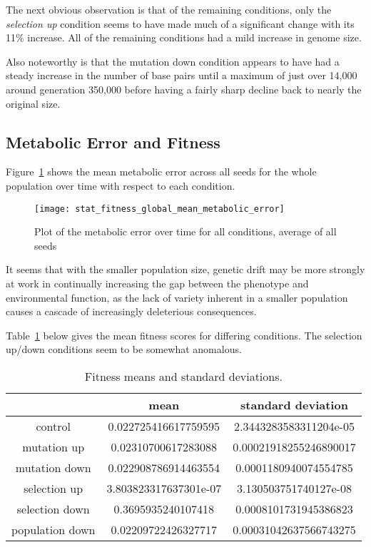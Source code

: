 The next obvious observation is that of the remaining conditions, only the \textit{selection up} condition seems to have made much of a significant change with its 11\% increase. All of the remaining conditions had a mild increase in genome size. 

Also noteworthy is that the mutation down condition appears to have had a steady increase in the number of base pairs until a maximum of just over 14,000 around generation 350,000 before having a fairly sharp decline back to nearly the original size. 

\subsection{Metabolic Error and Fitness}
Figure~\ref{fig:mean_metabolic_error} shows the mean metabolic error across all seeds for the whole population over time with respect to each condition. 
\begin{figure}[H]
	\texttt{[image: stat\_fitness\_global\_mean\_metabolic\_error]}
	\caption[Metabolic error]{Plot of the metabolic error over time for all conditions, average of all seeds}
	\label{fig:mean_metabolic_error}
\end{figure}
It seems that with the smaller population size, genetic drift may be more strongly at work in continually increasing the gap between the phenotype and environmental function, as the lack of variety inherent in a smaller population causes a cascade of increasingly deleterious consequences. 

Table~\ref{table:fitness_means_std_dev} below gives the mean fitness scores for differing conditions. The selection up/down conditions seem to be somewhat anomalous.
\begin{table}[H]
	\centering
	\begin{tabular}{|c||c|c|}
		\hline
		& \textbf{mean} & \textbf{standard deviation} \\
		\hline \hline
		control & 0.022725416617759595 & 2.3443283583311204e-05 \\
		\hline
		mutation up & 0.02310700617283088 & 0.00021918255246890017 \\
		\hline
		mutation down & 0.022908786914463554 & 0.0001180940074554785 \\
		\hline
		selection up & 3.803823317637301e-07 & 3.130503751740127e-08 \\
		\hline
		selection down & 0.3695935240107418	& 0.0008101731945386823 \\
		\hline
		population down & 0.02209722426327717 & 0.00031042637566743275 \\
		\hline
	\end{tabular}
	\caption[Fitness means and standard deviations.]{Fitness means and standard deviations. }
	\label{table:fitness_means_std_dev}
\end{table}

